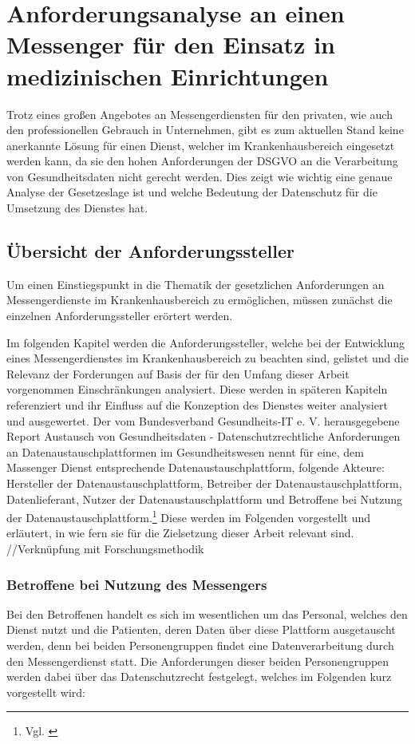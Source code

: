 \chapter{Anforderungsanalyse an einen Messenger für den Einsatz in medizinischen Einrichtungen}\label{chapter:ganforderungen}
Trotz eines großen Angebotes an Messengerdiensten für den privaten, wie auch den professionellen Gebrauch in Unternehmen, gibt es zum aktuellen Stand keine anerkannte Lösung für einen Dienst, welcher im Krankenhausbereich eingesetzt werden kann, da sie den hohen Anforderungen der DSGVO an die Verarbeitung von Gesundheitsdaten nicht gerecht werden. Dies zeigt wie wichtig eine genaue Analyse der Gesetzeslage ist und welche Bedeutung der Datenschutz für die Umsetzung des Dienstes hat.

\section{Übersicht der Anforderungssteller}\label{chapter:hintergrund}
Um einen Einstiegspunkt in die Thematik der gesetzlichen Anforderungen an Messengerdienste im Krankenhausbereich zu ermöglichen, müssen zunächst die einzelnen Anforderungssteller erörtert werden.

Im folgenden Kapitel werden die Anforderungssteller, welche bei der Entwicklung eines Messengerdienstes im Krankenhausbereich zu beachten sind, gelistet und die Relevanz der Forderungen auf Basis der für den Umfang dieser Arbeit vorgenommen Einschränkungen analysiert. Diese werden in späteren Kapiteln referenziert und ihr Einfluss auf die Konzeption des Dienstes weiter analysiert und ausgewertet. Der vom Bundesverband Gesundheits-IT e. V. herausgegebene Report \glqq Austausch von Gesundheitsdaten - Datenschutzrechtliche Anforderungen an Datenaustauschplattformen im Gesundheitswesen\grqq{} nennt für eine, dem Massenger Dienst entsprechende Datenaustauschplattform, folgende Akteure: Hersteller der Datenaustauschplattform, Betreiber der Datenaustauschplattform, Datenlieferant, Nutzer der Datenaustauschplattform und Betroffene bei Nutzung der Datenaustauschplattform.\footnote{Vgl. \cite[S. 13]{Schubert2014}} Diese werden im Folgenden vorgestellt und erläutert, in wie fern sie für die Zielsetzung dieser Arbeit relevant sind.
//Verknüpfung mit Forschungsmethodik

\subsection{Betroffene bei Nutzung des Messengers}\label{subsection:bbndd}
Bei den Betroffenen handelt es sich im wesentlichen um das Personal, welches den Dienst nutzt und die Patienten, deren Daten über diese Plattform ausgetauscht werden, denn bei beiden Personengruppen findet eine Datenverarbeitung durch den Messengerdienst statt. Die Anforderungen dieser beiden Personengruppen werden dabei über das Datenschutzrecht festgelegt, welches im Folgenden kurz vorgestellt wird:

